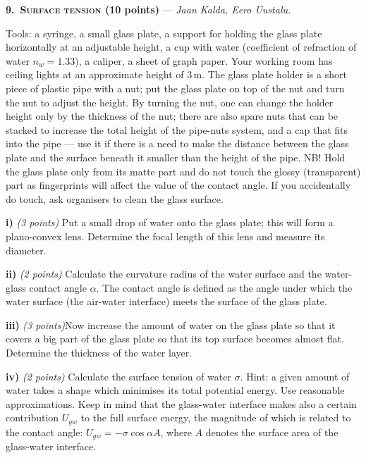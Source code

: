 \textbf{9.\ \textsc{Surface tension} (10 points)} --- \textit{Jaan Kalda, Eero Uustalu.}

Tools: a syringe, a small glass plate, a support for holding the glass plate
horizontally at an adjustable height, a cup with water (coefficient of
refraction of water $n_w = 1.33$), a caliper, a sheet of graph paper. Your
working room has ceiling lights at an approximate height of $3\,\mathrm{m}$. The
glass plate holder is a short piece of plastic pipe with a nut; put the glass
plate on top of the nut and turn the nut to adjust the height. By turning the
nut, one can change the holder height only by the thickness of the nut; there
are also spare nuts that can be stacked to increase the total height of the
pipe-nuts system, and a cap that fits into the pipe --- use it if there is a
need to make the distance between the glass plate and the surface beneath it
smaller than the height of the pipe. NB! Hold the glass plate only from its
matte part and do not touch the glossy (transparent) part as fingerprints will
affect the value of the contact angle. If you accidentally do touch, ask
organisers to clean the glass surface.

\textbf{i)} \textit{(3 points)} Put a small drop of water onto the glass plate;
this will form a plano-convex lens. Determine the focal length of this lens and
measure its diameter.

\textbf{ii)} \textit{(2 points)} Calculate the curvature radius of the water
surface and the water-glass contact angle $\alpha$. The contact angle is defined
as the angle under which the water surface (the air-water interface) meets the
surface of the glass plate.

\textbf{iii)} \textit{(3 points)}Now increase the amount of water on the glass
plate so that it covers a big part of the glass plate so that its top surface
becomes almost flat. Determine the thickness of the water layer.

\textbf{iv)} \textit{(2 points)} Calculate the surface tension of water
$\sigma$. Hint: a given amount of water takes a shape which minimises its total
potential energy. Use reasonable approximations. Keep in mind that the
glass-water interface makes also a certain contribution $U_{gw}$ to the full
surface energy, the magnitude of which is related to the contact angle:
$U_{gw} = -\sigma\cos\alpha A$, where $A$ denotes the surface area of the
glass-water interface.
